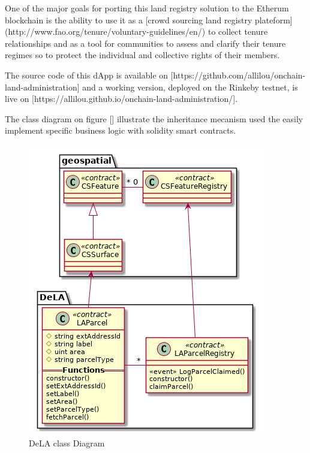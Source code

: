 \documentclass{isprs} %
\begin{document}
One of the major goals for porting this land registry solution to the Etherum blockchain is the ability to use it as a [crowd sourcing land registry plateform](http://www.fao.org/tenure/voluntary-guidelines/en/) to collect tenure relationships and as a tool for communities to assess and clarify their tenure regimes so to protect the individual and collective rights of their members. 

The source code of this dApp is available on [https://github.com/allilou/onchain-land-administration] and a working version, deployed on the Rinkeby testnet, is live on [https://allilou.github.io/onchain-land-administration/].

The class diagram on figure [] illustrate the inheritance mecanism used the easily implement specific business logic with solidity smart contracts.

\begin{figure}[ht!]
\begin{center}
		\includegraphics[width=1.0\columnwidth]{figures/class-dela.png}
	\caption{DeLA class Diagram}
\label{fig:figure_placement}
\end{center}
\end{figure}
\end{document}
